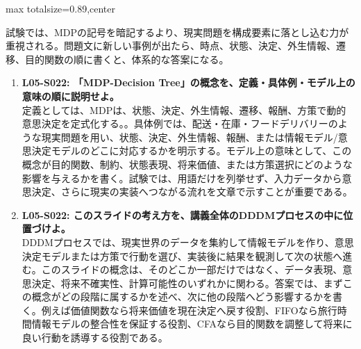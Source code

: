 \begin{minipage}[t]{0.58\textwidth}
\begin{adjustbox}{max totalsize={\textwidth}{0.89\textheight},center}
\begin{minipage}{\textwidth}
試験では、MDPの記号を暗記するより、現実問題を構成要素に落とし込む力が重視される。問題文に新しい事例が出たら、時点、状態、決定、外生情報、遷移、目的関数の順に書くと、体系的な答案になる。\par{}\begin{enumerate}\item \textbf{L05-S022: 「MDP-Decision Tree」の概念を、定義・具体例・モデル上の意味の順に説明せよ。}\\定義としては、MDPは、状態、決定、外生情報、遷移、報酬、方策で動的意思決定を定式化する。。具体例では、配送・在庫・フードデリバリーのような現実問題を用い、状態、決定、外生情報、報酬、または情報モデル/意思決定モデルのどこに対応するかを明示する。モデル上の意味として、この概念が目的関数、制約、状態表現、将来価値、または方策選択にどのような影響を与えるかを書く。試験では、用語だけを列挙せず、入力データから意思決定、さらに現実の実装へつながる流れを文章で示すことが重要である。\item \textbf{L05-S022: このスライドの考え方を、講義全体のDDDMプロセスの中に位置づけよ。}\\DDDMプロセスでは、現実世界のデータを集約して情報モデルを作り、意思決定モデルまたは方策で行動を選び、実装後に結果を観測して次の状態へ進む。このスライドの概念は、そのどこか一部だけではなく、データ表現、意思決定、将来不確実性、計算可能性のいずれかに関わる。答案では、まずこの概念がどの段階に属するかを述べ、次に他の段階へどう影響するかを書く。例えば価値関数なら将来価値を現在決定へ戻す役割、FIFOなら旅行時間情報モデルの整合性を保証する役割、CFAなら目的関数を調整して将来に良い行動を誘導する役割である。\end{enumerate}
\end{minipage}
\end{adjustbox}
\end{minipage}



